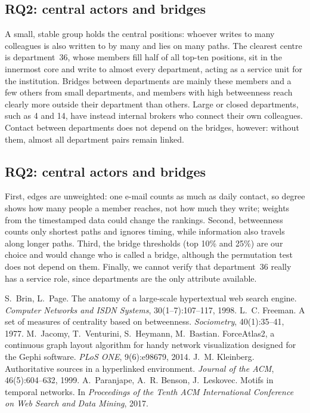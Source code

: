 \subsection{RQ2: central actors and bridges}
A small, stable group holds the central positions: whoever writes to many
colleagues is also written to by many and lies on many paths. The clearest
centre is department~36, whose members fill half of all top-ten positions,
sit in the innermost core and write to almost every department, acting as a
service unit for the institution. Bridges between departments are mainly
these members and a few others from small departments, and members with high
betweenness reach clearly more outside their department than others. Large
or closed departments, such as 4 and 14, have instead internal brokers who
connect their own colleagues. Contact between departments does not depend on
the bridges, however: without them, almost all department pairs remain
linked.


\subsection{RQ2: central actors and bridges}
First, edges are unweighted: one e-mail counts as much as daily contact, so
degree shows how many people a member reaches, not how much they write;
weights from the timestamped data could change the rankings. Second,
betweenness counts only shortest paths and ignores timing, while information
also travels along longer paths. Third, the bridge thresholds (top 10\% and
25\%) are our choice and would change who is called a bridge, although the
permutation test does not depend on them. Finally, we cannot verify that
department~36 really has a service role, since departments are the only
attribute available.


 S.~Brin, L.~Page. The anatomy of a large-scale
  hypertextual web search engine. \emph{Computer Networks and ISDN Systems},
  30(1--7):107--117, 1998.
 L.~C. Freeman. A set of measures of centrality based on
  betweenness. \emph{Sociometry}, 40(1):35--41, 1977.
 M.~Jacomy, T.~Venturini, S.~Heymann, M.~Bastian.
  ForceAtlas2, a continuous graph layout algorithm for handy network
  visualization designed for the Gephi software. \emph{PLoS ONE},
  9(6):e98679, 2014.
 J.~M. Kleinberg. Authoritative sources in a
  hyperlinked environment. \emph{Journal of the ACM}, 46(5):604--632, 1999.
 A.~Paranjape, A.~R. Benson, J.~Leskovec. Motifs in
  temporal networks. In \emph{Proceedings of the Tenth ACM International
  Conference on Web Search and Data Mining}, 2017.
